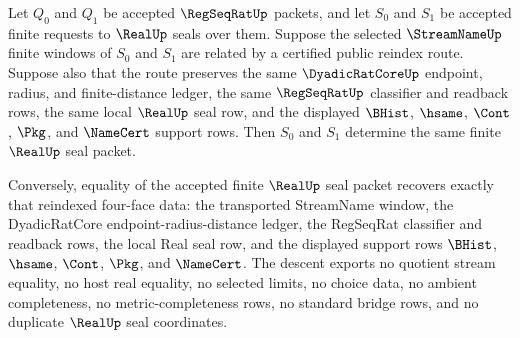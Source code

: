 \begin{theorem}
\label{thm:real-regseqrat-reindexed-finite-request-descent}
Let $Q_0$ and $Q_1$ be accepted $\RegSeqRatUp$ packets, and let $S_0$ and $S_1$ be accepted finite requests to $\RealUp$ seals over them. Suppose the selected $\StreamNameUp$ finite windows of $S_0$ and $S_1$ are related by a certified public reindex route. Suppose also that the route preserves the same $\DyadicRatCoreUp$ endpoint, radius, and finite-distance ledger, the same $\RegSeqRatUp$ classifier and readback rows, the same local $\RealUp$ seal row, and the displayed $\BHist$, $\hsame$, $\Cont$, $\Pkg$, and $\NameCert$ support rows. Then $S_0$ and $S_1$ determine the same finite $\RealUp$ seal packet.

Conversely, equality of the accepted finite $\RealUp$ seal packet recovers exactly that reindexed four-face data: the transported StreamName window, the DyadicRatCore endpoint-radius-distance ledger, the RegSeqRat classifier and readback rows, the local Real seal row, and the displayed support rows $\BHist$, $\hsame$, $\Cont$, $\Pkg$, and $\NameCert$. The descent exports no quotient stream equality, no host real equality, no selected limits, no choice data, no ambient completeness, no metric-completeness rows, no standard bridge rows, and no duplicate $\RealUp$ seal coordinates.
\end{theorem}
